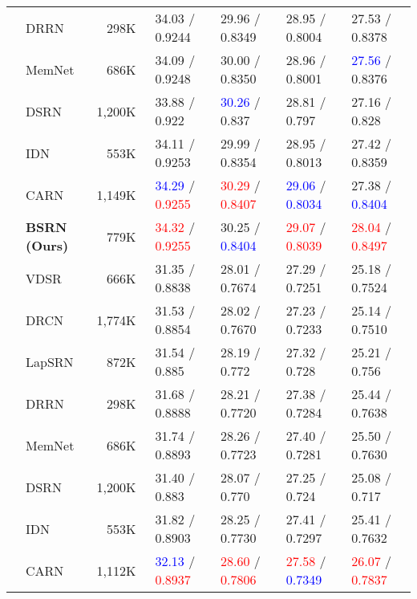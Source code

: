 \documentclass[runningheads]{llncs}
\begin{document}
\begin{table*}[t!]
\begin{center}
\begin{tabular}{c l r l l l l}
			& DRRN \cite{tai2017image} & 298K~ & 34.03 / 0.9244 & 29.96 / 0.8349 & 28.95 / 0.8004 & 27.53 / 0.8378 \\
			& MemNet \cite{tai2017memnet} & 686K~ & 34.09 / 0.9248 & 30.00 / 0.8350 & 28.96 / 0.8001 & \textcolor{blue}{27.56} / 0.8376 \\
			& DSRN \cite{han2018image} & 1,200K~ & 33.88 / 0.922~~ & \textcolor{blue}{30.26} / 0.837~~ & 28.81 / 0.797~~ & 27.16 / 0.828~~ \\
			& IDN \cite{hui2018fast} & 553K~ & 34.11 / 0.9253 & 29.99 / 0.8354 & 28.95 / 0.8013 & 27.42 / 0.8359 \\
			& CARN \cite{ahn2018fast} & 1,149K~ & \textcolor{blue}{34.29} / \textcolor{red}{0.9255} & \textcolor{red}{30.29} / \textcolor{red}{0.8407} & \textcolor{blue}{29.06} / \textcolor{blue}{0.8034} & 27.38 / \textcolor{blue}{0.8404} \\
			& \textbf{BSRN (Ours)} & 779K~ & \textcolor{red}{34.32} / \textcolor{red}{0.9255} & 30.25 / \textcolor{blue}{0.8404} & \textcolor{red}{29.07} / \textcolor{red}{0.8039} & \textcolor{red}{28.04} / \textcolor{red}{0.8497} \\
			\noalign{\smallskip}
			\hline
			\noalign{\smallskip}
			\multirow{9}{*}{4} & VDSR \cite{kim2016accurate} & 666K~ & 31.35 / 0.8838 & 28.01 / 0.7674 & 27.29 / 0.7251 & 25.18 / 0.7524 \\
			& DRCN \cite{kim2016deeply} & 1,774K~ & 31.53 / 0.8854 & 28.02 / 0.7670 & 27.23 / 0.7233 & 25.14 / 0.7510 \\
			& LapSRN \cite{lai2017deep} & 872K~ & 31.54 / 0.885~~ & 28.19 / 0.772~~ & 27.32 / 0.728~~ & 25.21 / 0.756~~ \\
			& DRRN \cite{tai2017image} & 298K~ & 31.68 / 0.8888 & 28.21 / 0.7720 & 27.38 / 0.7284 & 25.44 / 0.7638 \\
			& MemNet \cite{tai2017memnet} & 686K~ & 31.74 / 0.8893 & 28.26 / 0.7723 & 27.40 / 0.7281 & 25.50 / 0.7630 \\
			& DSRN \cite{han2018image} & 1,200K~ & 31.40 / 0.883~~ & 28.07 / 0.770~~ & 27.25 / 0.724~~ & 25.08 / 0.717~~ \\
			& IDN \cite{hui2018fast} & 553K~ & 31.82 / 0.8903 & 28.25 / 0.7730 & 27.41 / 0.7297 & 25.41 / 0.7632 \\
			& CARN \cite{ahn2018fast} & 1,112K~ & \textcolor{blue}{32.13} / \textcolor{red}{0.8937} & \textcolor{red}{28.60} / \textcolor{red}{0.7806} & \textcolor{red}{27.58} / \textcolor{blue}{0.7349} & \textcolor{red}{26.07} / \textcolor{red}{0.7837} \\

\end{tabular}
\end{center}
\end{table*}
\end{document}
